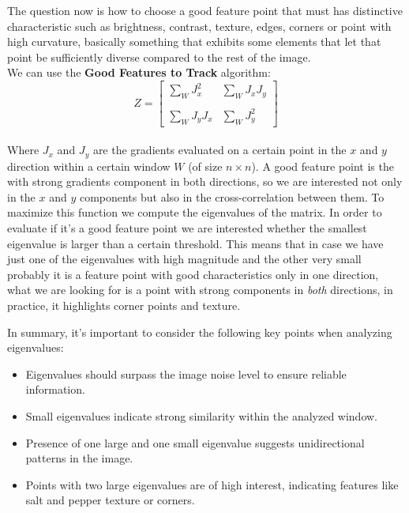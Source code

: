 The question now is how to choose a good feature point that must has distinctive characteristic such as brightness, contrast, texture, edges, corners or point with high curvature, basically something that exhibits some elements that let that point be sufficiently diverse compared to the rest of the image.
\\We can use the \textbf{Good Features to Track} algorithm:
\[
    Z = \begin{bmatrix}
        \sum_{W}^{}J_x^2 & \sum_{W}^{}J_xJ_y \\
        \\
        \sum_{W}^{}J_yJ_x & \sum_{W}^{}J_y^2
    \end{bmatrix}
\]
\\Where $J_x$ and $J_y$ are the gradients evaluated on a certain point in the $x$ and $y$ direction within a certain window $W$ (of size $n\times n$). 
A good feature point is the with strong gradients component in both directions, so we are interested not only in the \(x\) and \(y\) components but also in the cross-correlation between them. To maximize this function we compute the eigenvalues of the matrix. In order to evaluate if it's a good feature point we are interested whether the smallest eigenvalue is larger than a certain threshold. This means that in case we have just one of the eigenvalues with high magnitude and the other very small probably it is a feature point with good characteristics only in one direction, what we are looking for is a point with strong components in \textit{both} directions, in practice, it highlights corner points and texture.

In summary, it's important to consider the following key points when analyzing eigenvalues:
\begin{itemize}
    \item Eigenvalues should surpass the image noise level to ensure reliable information.
    \item Small eigenvalues indicate strong similarity within the analyzed window.
    \item Presence of one large and one small eigenvalue suggests unidirectional patterns in the image.
    \item Points with two large eigenvalues are of high interest, indicating features like salt and pepper texture or corners.
\end{itemize}

